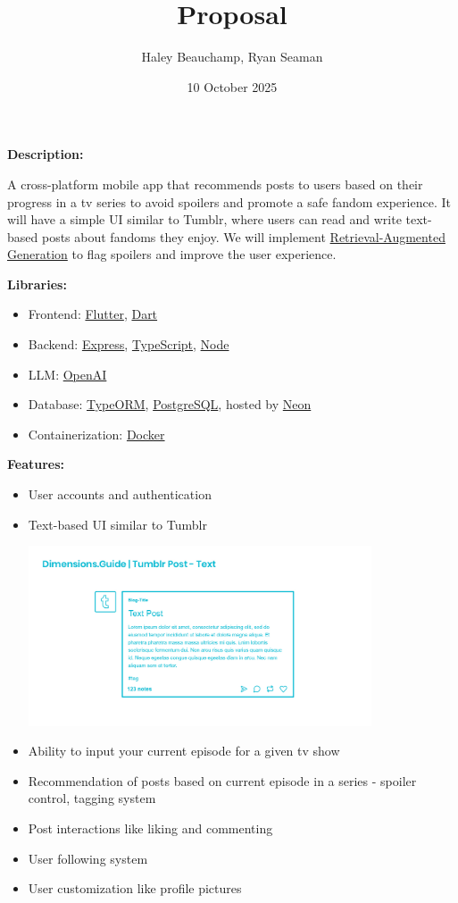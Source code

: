 \documentclass{homework}
\author{Haley Beauchamp, Ryan Seaman}
\date{10 October 2025}
\title{Proposal}
\begin{document}
 \maketitle

\textbf{Description:} 

A cross-platform mobile app that recommends posts to users based on their progress in a tv series to avoid spoilers and promote a safe fandom experience. It will have a simple UI similar to Tumblr, where users can read and write text-based posts about fandoms they enjoy. We will implement \hyperref[explanation]{Retrieval-Augmented Generation} to flag spoilers and improve the user experience. 

\bigskip

\textbf{Libraries:}
\begin{itemize}
  \item Frontend: 
  \href{https://flutter.dev/}{Flutter}, \href{https://dart.dev/}{Dart}
  \item Backend:    \href{https://expressjs.com/}{Express}, \href{https://www.typescriptlang.org/}{TypeScript}, 
  \href{https://nodejs.org/en}{Node}
  \item LLM: 
  \href{https://openai.com/}{OpenAI}
  \item Database: 
  \href{https://typeorm.io/}{TypeORM}, \href{https://www.postgresql.org/}{PostgreSQL}, hosted by
  \href{https://neon.com/}{Neon}
  \item Containerization: \href{https://www.docker.com/}{Docker}
\end{itemize}

\bigskip

\textbf{Features:}
\begin{itemize}
  \item User accounts and authentication
  \item Text-based UI similar to Tumblr

  \includegraphics[width=0.8\textwidth]{media/tumblr_example.jpg}

  \item Ability to input your current episode for a given tv show
  \item Recommendation of posts based on current episode in a series - spoiler control, tagging system
  \item Post interactions like liking and commenting
  \item User following system
  \item User customization like profile pictures
\end{itemize}
\end{document}
